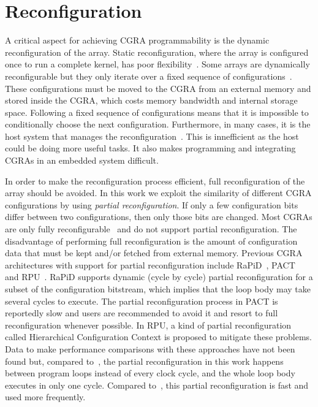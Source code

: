 \section{Reconfiguration}
\label{section:reconfiguration}


A critical aspect for achieving CGRA programmability is the dynamic
reconfiguration of the array. Static reconfiguration, where the array
is configured once to run a complete kernel, has poor
flexibility~\cite{Hartenstein01}. Some arrays are dynamically
reconfigurable but they only iterate over a fixed sequence of
configurations~\cite{Lee00,Mei05,Quax04}. These configurations must be
moved to the CGRA from an external memory and stored inside the CGRA,
which costs memory bandwidth and internal storage space. Following a
fixed sequence of configurations means that it is impossible to
conditionally choose the next configuration. Furthermore, in many
cases, it is the host system that manages the
reconfiguration~\cite{Lee00,Mei05,Hartenstein99}. This is innefficient
as the host could be doing more useful tasks. It also makes
programming and integrating CGRAs in an embedded system difficult.

In order to make the reconfiguration process efficient, full
reconfiguration of the array should be avoided. In this work we
exploit the similarity of different CGRA configurations by using {\em
  partial reconfiguration}. If only a few configuration bits differ
between two configurations, then only those bits are changed. Most
CGRAs are only fully reconfigurable~\cite{Lee00,Mei05,Hartenstein99}
and do not support partial reconfiguration. The disadvantage of
performing full reconfiguration is the amount of configuration data
that must be kept and/or fetched from external memory. Previous CGRA
architectures with support for partial reconfiguration include
RaPiD~\cite{Ebeling96}, PACT~\cite{Weinhardt03} and
RPU~\cite{Liu15}. RaPiD supports dynamic (cycle by cycle) partial
reconfiguration for a subset of the configuration bitstream, which
implies that the loop body may take several cycles to execute. The
partial reconfiguration process in PACT is reportedly slow and users
are recommended to avoid it and resort to full reconfiguration
whenever possible. In RPU, a kind of partial reconfiguration called
Hierarchical Configuration Context is proposed to mitigate these
problems.  Data to make performance comparisons with these approaches
have not been found but, compared to~\cite{Ebeling96}, the partial
reconfiguration in this work happens between program loops instead of
every clock cycle, and the whole loop body executes in only one
cycle. Compared to~\cite{Weinhardt03}, this partial reconfiguration is
fast and used more frequently.

